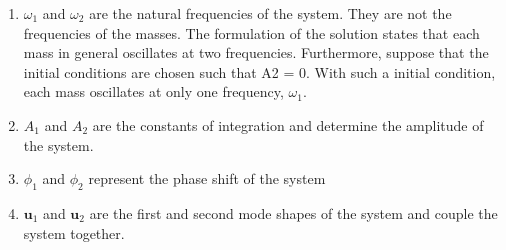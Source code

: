 \documentclass[12pt,letter]{article}
\numberwithin{ex}{section} %
\numberwithin{re}{section} %
\begin{document}
\begin{enumerate}
\item $\omega_1$ and $\omega_2$ are the natural frequencies of the system. They are not the frequencies of the masses. The formulation of the solution states that each mass in general oscillates at two frequencies. Furthermore, suppose that the initial conditions
are chosen such that A2 = 0. With such a initial condition, each mass oscillates at only
one frequency, $\omega_1$.
\item $A_1$ and $A_2$ are the constants of integration and determine the amplitude of the system.
\item $\phi_1$ and $\phi_2$ represent the phase shift of the system
\item $\mathbf{u}_1$ and $\mathbf{u}_2$ are the first and second mode shapes of the system and couple the system together.
\end{enumerate}
\end{document}
